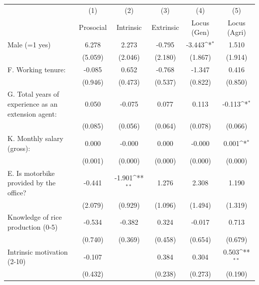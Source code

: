 {
\def\sym#1{\ifmmode^{#1}\else\(^{#1}\)\fi}
\begin{tabular}{l*{5}{c}}
\hline\hline
                    &\multicolumn{1}{c}{(1)}         &\multicolumn{1}{c}{(2)}         &\multicolumn{1}{c}{(3)}         &\multicolumn{1}{c}{(4)}         &\multicolumn{1}{c}{(5)}         \\
                    &Prosocial         &Intrinsic         &Extrinsic         &Locus (Gen)         &Locus (Agri)         \\
\hline
Male (=1 yes)       &6.278         &2.273         &-0.795         &-3.443\sym{*}  &1.510         \\
                    &(5.059)         &(2.046)         &(2.180)         &(1.867)         &(1.914)         \\
F. Working tenure:  &-0.085         &0.652         &-0.768         &-1.347         &0.416         \\
                    &(0.946)         &(0.473)         &(0.537)         &(0.822)         &(0.850)         \\
G. Total years of experience as an extension agent:&0.050         &-0.075         &0.077         &0.113         &-0.113\sym{*}  \\
                    &(0.085)         &(0.056)         &(0.064)         &(0.078)         &(0.066)         \\
K. Monthly salary (gross):&0.000         &-0.000         &0.000         &-0.000         &0.001\sym{*}  \\
                    &(0.001)         &(0.000)         &(0.000)         &(0.000)         &(0.000)         \\
E. Is motorbike provided by the office?&-0.441         &-1.901\sym{**} &1.276         &2.308         &1.190         \\
                    &(2.079)         &(0.929)         &(1.096)         &(1.494)         &(1.319)         \\
Knowledge of rice production (0-5)&-0.534         &-0.382         &0.324         &-0.017         &0.713         \\
                    &(0.740)         &(0.369)         &(0.458)         &(0.654)         &(0.679)         \\
Intrinsic motivation (2-10)&-0.107         &              &0.384         &0.304         &0.503\sym{**} \\
                    &(0.432)         &              &(0.238)         &(0.273)         &(0.190)         \\

\end{tabular}}
